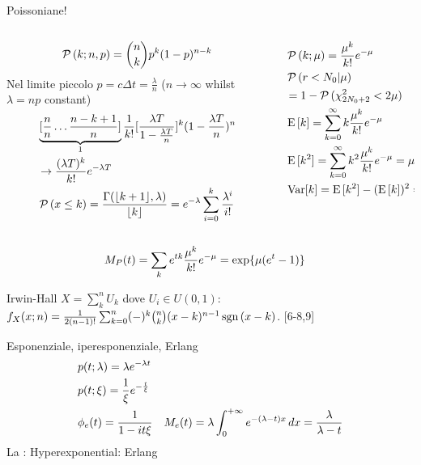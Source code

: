 \documentclass[asd-beamer.tex]{subfiles}
\begin{document}
\begin{frame}{Poissoniane!}
\begin{columns}[T]
	\begin{column}{0.5\textwidth}
\[\operatorname{\mathcal{P}}{(k;n,p)}=\binom{n}{k}p^k(1-p)^{n-k}\]
Nel limite piccolo $p=c\Delta t=\frac{\lambda}{n}$ ($n\to\infty$ whilst $\lambda=np$ constant)
\begin{align*}
&\underbrace{[\frac{n}{n}\ldots\frac{n-k+1}{n}]}_{1}\frac{1}{k!}[\frac{\lambda T}{1-\frac{\lambda T}{n}}]^k(1-\frac{\lambda T}{n})^n\\
&\to\frac{(\lambda T)^k}{k!}e^{-\lambda T}\\
&\operatorname{\mathcal{P}}{(x\leq k)}=\frac{\Gamma(\lfloor k+1\rfloor,\lambda)}{\lfloor k\rfloor}=e^{-\lambda}\sum_{i=0}^k\frac{\lambda^i}{i!}
\end{align*}
	\end{column}
	\begin{column}{0.5\textwidth}
		\begin{align*}
&\operatorname{\mathcal{P}}{(k;\mu)}=\frac{\mu^k}{k!}e^{-\mu}\\
&\operatorname{\mathcal{P}}{(r<N_0|\mu)}\\
&=1-\operatorname{\mathcal{P}}{(\chi^2_{2N_0+2}<2\mu)}\\
&\operatorname{E}{[k]}=\sum_{k=0}^{\infty}k\frac{\mu^k}{k!}e^{-\mu}\\
&\operatorname{E}{[k^2]}=\sum_{k=0}^{\infty}k^2\frac{\mu^k}{k!}e^{-\mu}=\mu^2+\mu\\
&\operatorname{Var}[k]=\operatorname{E}{[k^2]}-(\operatorname{E}{[k]})^2=\mu
\end{align*}
	\end{column}
\end{columns}
\begin{align*}
&M_P(t)=\sum_ke^{tk}\frac{\mu^k}{k!}e^{-\mu}=\text{exp}\{\mu(e^{t}-1)\}
\end{align*}
\end{frame}

\begin{frame}{Irwin-Hall}
$X=\sum_k^nU_k$ dove $U_i\in U(0,1)$: $f_X(x;n)=\frac{1}{2(n-1)!}\sum_{k=0}^n(-)^k\binom{n}{k}(x-k)^{n-1}\operatorname{sgn}{(x-k)}$.
[6-8,9]
    
\end{frame}

\begin{frame}{Esponenziale, iperesponenziale, Erlang}
\begin{align*}
&p(t;\lambda)=\lambda e^{-\lambda t}\\
&p(t;\xi)=\frac{1}{\xi}e^{-\frac{t}{\xi}}\\
&\phi_e(t)=\frac{1}{1-it\xi}
&M_e(t)=\lambda\int_{0}^{+\infty}{}e^{-(\lambda-t)x}\,dx=\frac{\lambda}{\lambda-t}
\end{align*}
La : 
Hyperexponential:
Erlang
\end{frame}
\end{document}
